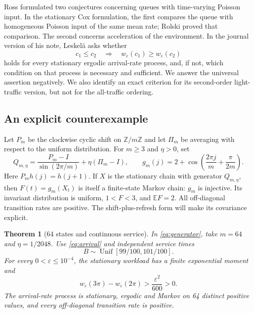 \documentclass[aap,preprint]{imsart}
\numberwithin{equation}{section}
\theoremstyle{plain}
\newtheorem{theorem}{Theorem}[section]
\theoremstyle{definition}
\newcommand{\E}{\mathbb E}
\newcommand{\Z}{\mathbb Z}
\newcommand{\1}{\mathbf 1}
\newcommand{\eps}{\varepsilon}
\DeclareMathOperator{\Unif}{Unif}
\begin{document}
Ross \cite{Ross78} formulated two conjectures concerning queues with time-varying Poisson input. In the stationary Cox formulation, the first compares the queue with homogeneous Poisson input of the same mean rate; Rolski \cite{Rolski81} proved that comparison. The second concerns acceleration of the environment. In the journal version of his note, Leskel\"a \cite[Problem~1, p.~214]{Leskela22} asks whether
\begin{equation}\label{eq:ross}
 c_1\le c_2\quad\Longrightarrow\quad w_\eps(c_1)\ge w_\eps(c_2)
\end{equation}
holds for every stationary ergodic arrival-rate process, and, if not, which condition on that process is necessary and sufficient. We answer the universal assertion negatively. We also identify an exact criterion for its second-order light-traffic version, but not for the all-traffic ordering.

\subsection{An explicit counterexample}
Let $P_m$ be the clockwise cyclic shift on $\Z/m\Z$ and let $\Pi_m$ be averaging with respect to the uniform distribution. For $m\ge3$ and $\eta>0$, set
\begin{equation}\label{eq:generator}
 Q_{m,\eta}=\frac{P_m-I}{\sin(2\pi/m)}+\eta(\Pi_m-I),
 \qquad
 g_m(j)=2+\cos\left(\frac{2\pi j}{m}+\frac{\pi}{2m}\right).
\end{equation}
Here $P_mh(j)=h(j+1)$. If $X$ is the stationary chain with generator $Q_{m,\eta}$, then $F(t)=g_m(X_t)$ is itself a finite-state Markov chain: $g_m$ is injective. Its invariant distribution is uniform, $1<F<3$, and $\E F=2$. All off-diagonal transition rates are positive. The shift-plus-refresh form will make its covariance explicit.

\begin{theorem}[64 states and continuous service]\label{thm:64}
In \eqref{eq:generator}, take $m=64$ and $\eta=1/2048$. Use \eqref{eq:arrival} and independent service times
\begin{equation}\label{eq:uniformservice}
 B\sim\Unif[99/100,101/100].
\end{equation}
For every $0<\eps\le10^{-4}$, the stationary workload has a finite exponential moment and
\begin{equation}\label{eq:64main}
 w_\eps(3\pi)-w_\eps(2\pi)>\frac{\eps^2}{600}>0.
\end{equation}
The arrival-rate process is stationary, ergodic and Markov on 64 distinct positive values, and every off-diagonal transition rate is positive.
\end{theorem}
\end{document}
